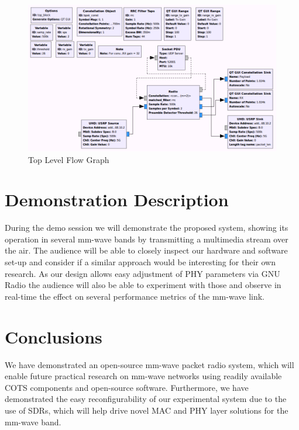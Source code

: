 \documentclass{sig-alternate}
\begin{document}
\begin{figure}
\center
\includegraphics[scale=0.41]{transceiver.png}
\caption{Top Level Flow Graph}
\label{fig:top-block}
\end{figure}

\section{Demonstration Description} 
During the demo session we will demonstrate the proposed system, showing its operation in several mm-wave bands by transmitting a multimedia stream over the air. %
The audience will be able to closely inspect our hardware and software set-up and consider if a similar approach would be interesting for their own research. %
As our design allows easy adjustment of PHY parameters via GNU Radio the audience will also be able to experiment with those %
and observe  in real-time the effect on several performance metrics of the mm-wave link.


\section{Conclusions}
We have demonstrated an open-source mm-wave packet radio system, which will enable future practical research on mm-wave networks using readily available COTS components and open-source software. Furthermore, we have demonstrated the easy reconfigurability of our experimental system due to the use of SDRs, which will help drive novel MAC and PHY layer solutions for the mm-wave band.




\balancecolumns
\end{document}
